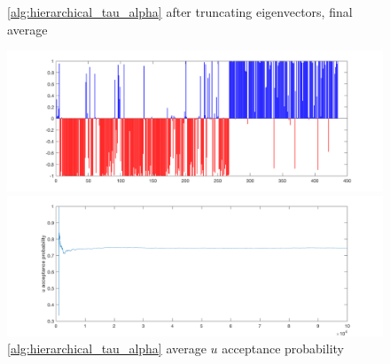 \documentclass{siamart1116}
\begin{document}
    \begin{figure}[!htb]
    \begin{minipage}{0.48\textwidth}
        \caption{\label{fig:centered_voting_avg} \cref{alg:hierarchical_tau_alpha} after truncating eigenvectors, final average}
        \includegraphics[width=\linewidth]{voting/centered/final_avg.png}
    \end{minipage}\hfill
    \begin{minipage}{0.48\textwidth}
        \caption{\label{fig:centered_voting_accept} \cref{alg:hierarchical_tau_alpha} average $u$ acceptance probability}
        \includegraphics[width=\linewidth]{voting/centered/acceptance_u_probability.png}
    \end{minipage}
    \end{figure}
\end{document}
